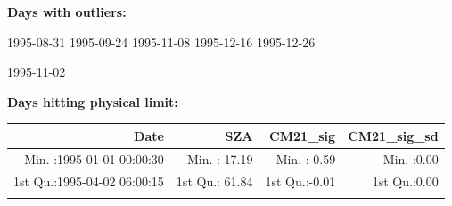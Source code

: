 \documentclass[
  10pt,
  a4paper,oneside]{article}
\begin{document}
\normalsize

\textbf{Days with outliers:}

1995-08-31 1995-09-24 1995-11-08 1995-12-16 1995-12-26

1995-11-02

\textbf{Days hitting physical limit:}

\footnotesize

\begin{longtable}[]{@{}rrrr@{}}
\toprule
\begin{minipage}[b]{0.34\columnwidth}\raggedleft
Date\strut
\end{minipage} & \begin{minipage}[b]{0.19\columnwidth}\raggedleft
SZA\strut
\end{minipage} & \begin{minipage}[b]{0.18\columnwidth}\raggedleft
CM21\_sig\strut
\end{minipage} & \begin{minipage}[b]{0.18\columnwidth}\raggedleft
CM21\_sig\_sd\strut
\end{minipage}\tabularnewline
\midrule
\endhead
\begin{minipage}[t]{0.34\columnwidth}\raggedleft
Min. :1995-01-01 00:00:30\strut
\end{minipage} & \begin{minipage}[t]{0.19\columnwidth}\raggedleft
Min. : 17.19\strut
\end{minipage} & \begin{minipage}[t]{0.18\columnwidth}\raggedleft
Min. :-0.59\strut
\end{minipage} & \begin{minipage}[t]{0.18\columnwidth}\raggedleft
Min. :0.00\strut
\end{minipage}\tabularnewline
\begin{minipage}[t]{0.34\columnwidth}\raggedleft
1st Qu.:1995-04-02 06:00:15\strut
\end{minipage} & \begin{minipage}[t]{0.19\columnwidth}\raggedleft
1st Qu.: 61.84\strut
\end{minipage} & \begin{minipage}[t]{0.18\columnwidth}\raggedleft
1st Qu.:-0.01\strut
\end{minipage} & \begin{minipage}[t]{0.18\columnwidth}\raggedleft
1st Qu.:0.00\strut
\end{minipage}\tabularnewline
\begin{minipage}[t]{0.34\columnwidth}\raggedleft

\end{minipage}
\end{longtable}
\end{document}
